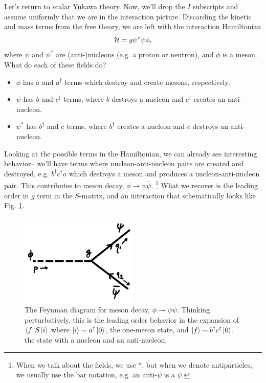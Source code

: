 Let's return to scalar Yukawa theory. Now, we'll drop the $I$ subscripts and assume uniformly that we are in the interaction picture. Discarding the kinetic and mass terms from the free theory, we are left with the interaction Hamiltonian
$$\mathcal H = g \psi^* \psi \phi,$$
where $\psi$ and $\psi^*$ are (anti-)nucleons (e.g. a proton or neutron), and $\phi$ is a meson. What do each of these fields do?
\begin{itemize}
    \item $\phi$ has $a$ and $a^\dagger$ terms which destroy and create mesons, respectively.
    \item $\psi$ has $b$ and $c^\dagger$ terms, where $b$ destroys a nucleon and $c^\dagger$ creates an anti-nucleon.
    \item $\psi^*$ has $b^\dagger$ and $c$ terms, where $b^\dagger$ creates a nucleon and $c$ destroys an anti-nucleon.
\end{itemize}
Looking at the possible terms in the Hamiltonian, we can already see interesting behavior-- we'll have terms where nucleon-anti-nucleon pairs are created and destroyed, e.g. $b^\dagger c^\dagger a$ which destroys a meson and produces a nucleon-anti-nucleon pair. This contributes to meson decay, $\phi\to \psi\bar \psi$.%
    \footnote{When we talk about the fields, we use $*$, but when we denote antiparticles, we usually use the bar notation, e.g. an anti-$\psi$ is a $\bar \psi$.} 
What we recover is the leading order in $g$ term in the $S$-matrix, and an interaction that schematically looks like Fig. \ref{fig:mesondecay1}.

\begin{figure}
    \centering
    \includegraphics[width=0.5\textwidth]{2018/10/20181020_mesondecay.png}
    \caption{The Feynman diagram for meson decay, $\phi\to \psi\bar \psi$. Thinking perturbatively, this is the leading order behavior in the expansion of $\left< f \right|S\left| i \right>$ where $\left| i \right>\sim a^\dagger \left| 0 \right>$, the one-meson state, and $\left| f \right>\sim b^\dagger c^\dagger \left| 0 \right>$, the state with a nucleon and an anti-nucleon.}
    \label{fig:mesondecay1}
\end{figure}

